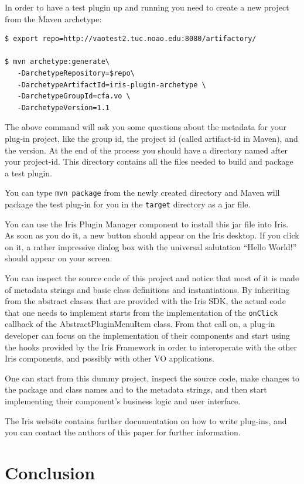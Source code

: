 \documentclass[5p]{elsarticle}
\begin{document}
In order to have a test plugin up and running you need to create a new project from the Maven archetype:

\begin{lstlisting}[style=code]
$ export repo=http://vaotest2.tuc.noao.edu:8080/artifactory/

$ mvn archetype:generate\
   -DarchetypeRepository=$repo\
   -DarchetypeArtifactId=iris-plugin-archetype \
   -DarchetypeGroupId=cfa.vo \
   -DarchetypeVersion=1.1
\end{lstlisting}

The above command will ask you some questions about the metadata for your plug-in project, like the group id, the project id (called artifact-id in Maven), and the version. At the end of the process you should have a directory named after your project-id. This directory contains all the files needed to build and package a test plugin.

You can type \verb|mvn package| from the newly created directory and Maven will package the test plug-in for you in the \verb|target| directory as a jar file.

You can use the Iris Plugin Manager component to install this jar file into Iris. As soon as you do it, a new button should appear on the Iris desktop. If you click on it, a rather impressive dialog box with the universal salutation ``Hello World!'' should appear on your screen.

You can inspect the source code of this project and notice that most of it is made of metadata strings and basic class definitions and instantiations. By inheriting from the abstract classes that are provided with the Iris SDK, the actual code that one needs to implement starts from the implementation of the \verb|onClick| callback of the AbstractPluginMenuItem class. From that call on, a plug-in developer can focus on the implementation of their components and start using the hooks provided by the Iris Framework in order to interoperate with the other Iris components, and possibly with other VO applications.

One can start from this dummy project, inspect the source code, make changes to the package and class names and to the metadata strings, and then start implementing their component's business logic and user interface.

The Iris website contains further documentation on how to write plug-ins, and you can contact the authors of this paper for further information.

\section{Conclusion}
\label{sec:conclusion}
\end{document}
